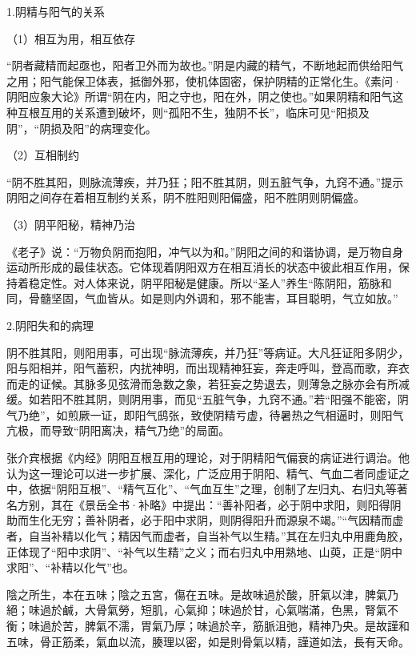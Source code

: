 \documentclass[draft,12pt]{ctexbook}
\begin{document}

1.阴精与阳气的关系

（1）相互为用，相互依存

“阴者藏精而起亟也，阳者卫外而为故也。”阴是内藏的精气，不断地起而供给阳气之用；阳气能保卫体表，抵御外邪，使机体固密，保护阴精的正常化生。《素问·阴阳应象大论》所谓“阴在内，阳之守也，阳在外，阴之使也。”如果阴精和阳气这种互根互用的关系遭到破坏，则“孤阳不生，独阴不长”，临床可见“阳损及阴”，“阴损及阳”的病理变化。

（2）互相制约

“阴不胜其阳，则脉流薄疾，并乃狂；阳不胜其阴，则五脏气争，九窍不通。”提示阴阳之间存在着相互制约关系，阴不胜阳则阳偏盛，阳不胜阴则阴偏盛。

（3）阴平阳秘，精神乃治

《老子》说：“万物负阴而抱阳，冲气以为和。”阴阳之间的和谐协调，是万物自身运动所形成的最佳状态。它体现着阴阳双方在相互消长的状态中彼此相互作用，保持着稳定性。对人体来说，阴平阳秘是健康。所以“圣人”养生“陈阴阳，筋脉和同，骨髓坚固，气血皆从。如是则内外调和，邪不能害，耳目聪明，气立如放。”

2.阴阳失和的病理

阴不胜其阳，则阳用事，可出现“脉流薄疾，并乃狂”等病证。大凡狂证阳多阴少，阳与阳相并，阳气蓄积，内扰神明，而出现精神狂妄，奔走呼叫，登高而歌，弃衣而走的证候。其脉多见弦滑而急数之象，若狂妄之势退去，则薄急之脉亦会有所减缓。如若阳不胜其阴，则阴用事，而见“五脏气争，九窍不通。”若“阳强不能密，阴气乃绝”，如煎厥一证，即阳气鸱张，致使阴精亏虚，待暑热之气相逼时，则阳气亢极，而导致“阴阳离决，精气乃绝”的局面。



张介宾根据《内经》阴阳互根互用的理论，对于阴精阳气偏衰的病证进行调治。他认为这一理论可以进一步扩展、深化，广泛应用于阴阳、精气、气血二者同虚证之中，依据“阴阳互根”、“精气互化”、“气血互生”之理，创制了左归丸、右归丸等著名方别，其在《景岳全书·补略》中提出：“善补阳者，必于阴中求阳，则阳得阴助而生化无穷；善补阴者，必于阳中求阴，则阴得阳升而源泉不竭。”“气因精而虚者，自当补精以化气；精因气而虚者，自当补气以生精。”其在左归丸中用鹿角胶，正体现了“阳中求阴”、“补气以生精”之义；而右归丸中用熟地、山萸，正是“阴中求阳”、“补精以化气”也。


\begin{yuanwen}
陰之所生，本在五味；陰之五宮，傷在五味。是故味過於酸，肝氣以津，脾氣乃絕；味過於鹹，大骨氣勞，短肌，心氣抑；味過於甘，心氣喘滿，色黑，腎氣不衡；味過於苦，脾氣不濡，胃氣乃厚；味過於辛，筋脈沮弛，精神乃央。是故謹和五味，骨正筋柔，氣血以流，腠理以密，如是則骨氣以精，謹道如法，長有天命。
\end{yuanwen}
\end{document}
